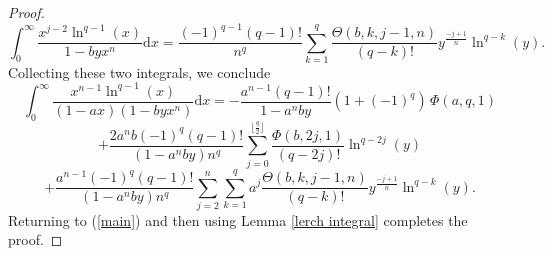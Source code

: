 \documentclass[10pt,a4paper]{amsart}
\begin{document}
\begin{proof}
	\begin{equation}
		\int_0^\infty\frac{x^{j-2}\ln^{q-1}(x)}{1-byx^{n}}\mathrm{d} x=\frac{{(-1)}^{q-1}(q-1)!}{n^{q}}\sum_{k=1}^{q}\frac{\Theta(b,k,j-1,n)}{(q-k)!}y^{\frac{-j+1}{n}}\ln^{q-k}(y).\label{first integral}
	\end{equation}
	Collecting these two integrals, we conclude
	\[\int_0^\infty\frac{ x^{n-1}\ln^{q-1}(x)}{(1-ax)(1-byx^{n})}\mathrm{d} x
	=-\frac{a^{n-1}(q-1)!}{1-a^n by}(1+{(-1)}^{q})\,\Phi(a,q,1)\]
	\[+\frac{2a^nb{(-1)}^{q} (q-1)!}{(1-a^n by)n^{q}}\sum_{j=0}^{\lfloor\frac{q}{2}\rfloor}\frac{\Phi(b,2j,1)}{(q-2j)!}\ln^{q-2j}(y)\]
	\[+\frac{a^{n-1}{(-1)}^{q}(q-1)!}{(1-a^n by)n^{q}}\sum_{j=2}^n \sum_{k=1}^{q}a^{j}\frac{\Theta(b,k,j-1,n)}{(q-k)!}y^{\frac{-j+1}{n}}\ln^{q-k}(y).\]
	Returning to (\ref{main}) and then using Lemma \ref{lerch integral} completes the proof.
\end{proof}
\end{document}
